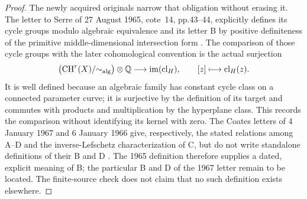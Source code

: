 \begin{proof}
The newly acquired originals narrow that obligation without
erasing it. The letter to Serre of 27 August 1965, cote~14,
pp.43--44, explicitly defines its cycle groups modulo
algebraic equivalence and its letter B by positive
definiteness of the primitive middle-dimensional intersection
form \cite{AuditGrothendieckSerre1965}. The comparison of
those cycle groups with the later cohomological convention
is the actual surjection
\[
 \bigl(\operatorname{CH}^r(X)/{\sim_{\rm alg}}\bigr)\otimes\mathbb Q
 \longrightarrow \operatorname{im}(\operatorname{cl}_H),
 \qquad [z]\longmapsto\operatorname{cl}_H(z).
\]
It is well defined because an algebraic family has constant
cycle class on a connected parameter curve; it is surjective
by the definition of its target and commutes with products
and multiplication by the hyperplane class. This records
the comparison without identifying its kernel with zero.
The Coates letters of 4 January 1967 and 6 January 1966
give, respectively, the stated relations among A--D and
the inverse-Lefschetz characterization of C, but do not
write standalone definitions of their B and D
\cite[pp.1--3]{AuditGrothendieckCoates1967}
\cite[p.1]{AuditGrothendieckCoates1966}.
The 1965 definition therefore supplies a dated, explicit
meaning of B; the particular B and D of the 1967 letter
remain to be located. The finite-source check does not
claim that no such definition exists elsewhere.
\end{proof}

